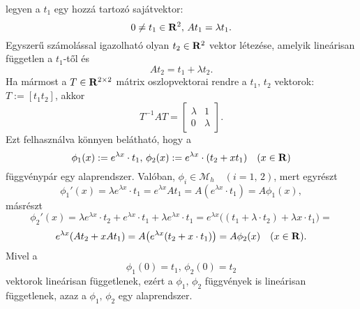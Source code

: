 legyen a $t_1$ egy hozzá tartozó sajátvektor:
\[
	0 \neq t_1 \in \mathbf{R}^2, \, At_1 = \lambda t_1.
\]
Egyszerű számolással igazolható olyan $t_2 \in \mathbf{R}^2$ vektor létezése, amelyik lineárisan független a $t_1$-től és
\[
	At_2 = t_1 + \lambda t_2.
\]
Ha mármost a $T \in \mathbf{R}^{2 \times 2}$ mátrix oszlopvektorai rendre a $t_1, \, t_2$ vektorok: $T := [t_1 t_2]$, akkor
\[
	T^{-1}AT = \begin{bmatrix}
		\lambda & 1 \\
		0 & \lambda
	\end{bmatrix}.
\]
Ezt felhasználva könnyen belátható, hogy a
\[
	\phi_1(x) := e^{\lambda x} \cdot t_1, \, \phi_2(x) := e^{\lambda x} \cdot (t_2 + xt_1) \quad (x \in \mathbf{R})
\]
függvénypár egy alaprendszer. Valóban, $\phi_i \in \mathcal{M}_h \quad (i = 1, \, 2)$, mert egyrészt
\[
	\phi_1'(x) = \lambda e^{\lambda x} \cdot t_1 = e^{\lambda x} A t_1 = A(e^{\lambda x} \cdot t_1) = A\phi_1(x),
\]
másrészt
\[
	\phi_2'(x) = \lambda e^{\lambda x} \cdot t_2 + e^{\lambda x} \cdot t_1 + \lambda e^{\lambda x} \cdot t_1 = e^{\lambda x} \big( (t_1 + \lambda \cdot t_2) + \lambda x \cdot t_1 \big) =
\]
\[
	e^{\lambda x} (At_2 + xAt_1) = A\big( e^{\lambda x}(t_2 + x \cdot t_1) \big) = A \phi_2(x) \quad (x \in \mathbf{R}).
\]
Mivel a
\[
	\phi_1(0) = t_1, \, \phi_2(0) = t_2
\]
vektorok lineárisan függetlenek, ezért a $\phi_1, \, \phi_2$ függvények is lineárisan függetlenek, azaz a $\phi_1, \, \phi_2$ egy alaprendszer.